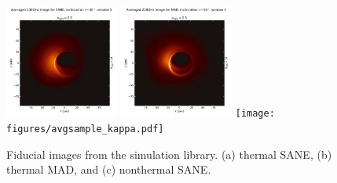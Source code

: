 

\begin{figure}
  \centering
  \includegraphics[width=0.333\textwidth]{figures/avgsample_SANE.pdf}%
  \includegraphics[width=0.333\textwidth]{figures/avgsample_MAD.pdf}%
  \texttt{[image: figures/avgsample\_kappa.pdf]}
  \caption{Fiducial images from the simulation library.
    (a) thermal SANE, (b) thermal MAD, and (c) nonthermal SANE.}
  \label{fig:fiducial_imgs}
\end{figure}

